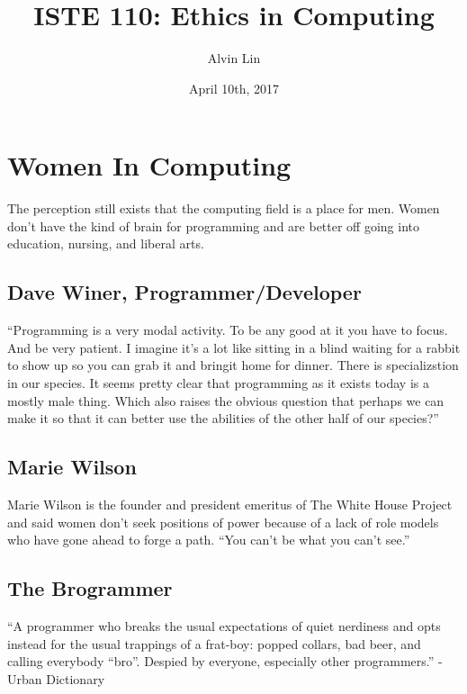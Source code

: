 \documentclass[letterpaper, 12pt]{article}
\title{ISTE 110: Ethics in Computing}
\author{Alvin Lin}
\date{April 10th, 2017}
\begin{document}
\maketitle

\section*{Women In Computing}
The perception still exists that the computing field is a place for men. Women
don't have the kind of brain for programming and are better off going into
education, nursing, and liberal arts.

\subsection*{Dave Winer, Programmer/Developer}
``Programming is a very modal activity. To be any good at it you have to focus.
And be very patient. I imagine it's a lot like sitting in a blind waiting for a
rabbit to show up so you can grab it and bringit home for dinner. There is
specializstion in our species. It seems pretty clear that programming as it
exists today is a mostly male thing. Which also raises the obvious question
that perhaps we can make it so that it can better use the abilities of the
other half of our species?''

\subsection*{Marie Wilson}
Marie Wilson is the founder and president emeritus of The White House Project
and said women don't seek positions of power because of a lack of role models
who have gone ahead to forge a path. ``You can't be what you can't see.''

\subsection*{The Brogrammer}
``A programmer who breaks the usual expectations of quiet nerdiness and opts
instead for the usual trappings of a frat-boy: popped collars, bad beer, and
calling everybody ``bro''. Despied by everyone, especially other programmers.''
- Urban Dictionary
\end{document}
